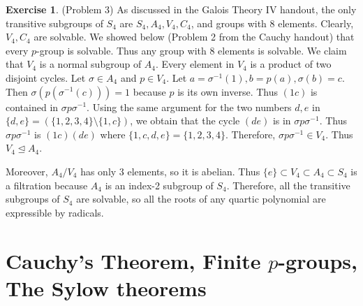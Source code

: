 \documentclass[12pt, psamsfonts]{amsart}
\theoremstyle{definition}
\newtheorem*{exer}{Exercise}
\theoremstyle{remark}
\numberwithin{equation}{section}
\begin{document}
\begin{exer}{(Problem 3)}
  As discussed in the Galois Theory IV handout, the only transitive subgroups of $S_4$ are $S_4, A_4, V_4, C_4$, and groups with 8 elements.
  Clearly, $V_4, C_4$ are solvable.
  We showed below (Problem 2 from the Cauchy handout) that every $p$-group is solvable.
  Thus any group with 8 elements is solvable.
  We claim that $V_4$ is a normal subgroup of $A_4$.
  Every element in $V_4$ is a product of two disjoint cycles.
  Let $\sigma \in A_4$ and $p \in V_4$.
  Let $a = \sigma^{-1}(1), b = p(a), \sigma(b) = c$.
  Then $\sigma(p(\sigma^{-1}(c))) = 1$ because $p$ is its own inverse.
  Thus $(1c)$ is contained in $\sigma p\sigma^{-1}$.
  Using the same argument for the two numbers $d, e$ in $\{ d, e \} = (\{ 1, 2, 3, 4 \} \setminus \{ 1, c \})$, we obtain that the cycle $(de)$ is in $\sigma p \sigma^{-1}$.
  Thus $\sigma p \sigma^{-1}$ is $(1c)(de)$ where $\{ 1, c, d, e \} = \{ 1, 2, 3, 4 \}$.
  Therefore,  $\sigma p \sigma^{-1} \in V_4$.
  Thus $V_4 \trianglelefteq A_4$.

  Moreover, $A_4 / V_4$ has only 3 elements, so it is abelian.
  Thus $\{ e \} \subset V_4 \subset A_4 \subset S_4$ is a filtration because $A_4$ is an index-2 subgroup of $S_4$.
  Therefore, all the transitive subgroups of $S_4$ are solvable, so all the roots of any quartic polynomial are expressible by radicals.
\end{exer}

\section{Cauchy's Theorem, Finite $p$-groups, The Sylow theorems}
\end{document}
